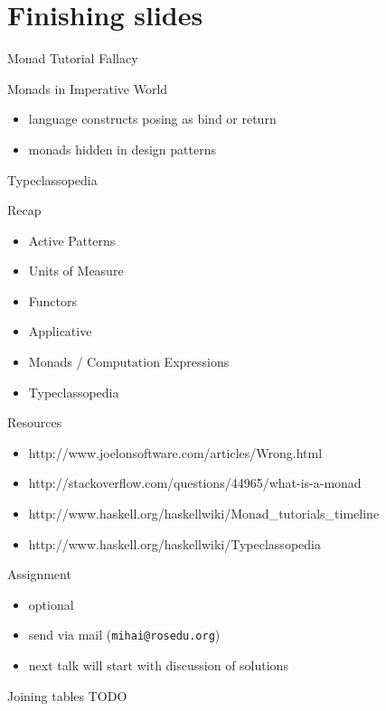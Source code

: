 \documentclass{beamer}
\begin{document}
\section{Finishing slides}
\frame{\tableofcontents[currentsection]}

\begin{frame}{Monad Tutorial Fallacy}
  \center
\end{frame}

\begin{frame}{Monads in Imperative World}
  \begin{itemize}[<+->]
    \item language constructs posing as bind or return
    \item monads hidden in design patterns
  \end{itemize}
\end{frame}

\begin{frame}{Typeclassopedia}
  \center
\end{frame}

\begin{frame}{Recap}
  \begin{itemize}[<+->]
    \item Active Patterns
    \item Units of Measure
    \item Functors
    \item Applicative
    \item Monads / Computation Expressions
    \item Typeclassopedia
  \end{itemize}
\end{frame}

\begin{frame}{Resources}
  \begin{itemize}
    \item http://www.joelonsoftware.com/articles/Wrong.html
    \item http://stackoverflow.com/questions/44965/what-is-a-monad
    \item http://www.haskell.org/haskellwiki/Monad\_tutorials\_timeline
    \item http://www.haskell.org/haskellwiki/Typeclassopedia
  \end{itemize}
\end{frame}

\begin{frame}[fragile]{Assignment}
  \begin{itemize}
    \item optional
    \item send via mail (\texttt{mihai@rosedu.org})
    \item next talk will start with discussion of solutions
  \end{itemize}
  \pause
  \begin{block}{Joining tables}
  TODO
  \end{block}
\end{frame}
\end{document}
